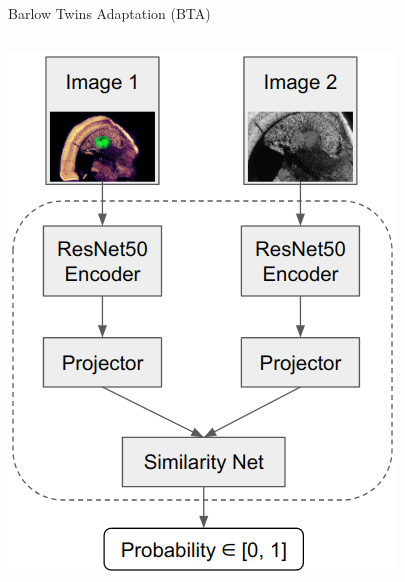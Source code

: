 \documentclass{beamer}
\begin{document}
\begin{frame}{Barlow Twins Adaptation (BTA)}
\begin{columns}
    \begin{center}
        \includegraphics[width=1\textwidth]{fig/model.png}
    \end{center}
\end{columns}
\end{frame}

\end{document}
